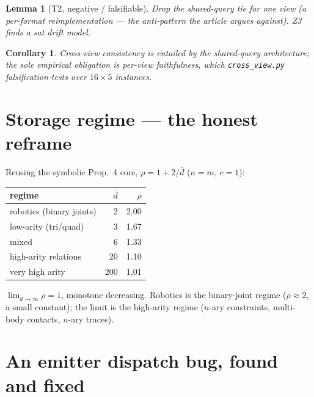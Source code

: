 \documentclass[11pt]{article}
\newtheorem{lemma}{Lemma}
\newtheorem{corollary}{Corollary}
\theoremstyle{definition}
\begin{document}
\begin{lemma}[T2, negative / falsifiable]
Drop the shared-query tie for one view (a per-format reimplementation --- the anti-pattern the article argues
against). Z3 finds a \textsf{sat} drift model.
\end{lemma}

\begin{corollary}
Cross-view consistency is \emph{entailed} by the shared-query architecture; the sole empirical obligation is
per-view faithfulness, which \texttt{cross\_view.py} falsification-tests over $16\times5$ instances.
\end{corollary}



\section{Storage regime --- the honest reframe}
\label{sec:storage_regime}

Reusing the symbolic Prop.~4 core, $\rho = 1 + 2/\bar d$ ($n=m,\,c=1$):

\begin{center}\small
\begin{tabular}{lrr}
\toprule regime & $\bar d$ & $\rho$ \\ \midrule
robotics (binary joints) & 2 & 2.00 \\
low-arity (tri/quad) & 3 & 1.67 \\
mixed & 6 & 1.33 \\
high-arity relations & 20 & 1.10 \\
very high arity & 200 & 1.01 \\ \bottomrule
\end{tabular}
\end{center}

$\lim_{\bar d\to\infty}\rho = 1$, monotone decreasing. Robotics is the binary-joint regime ($\rho\approx2$, a
small constant); the limit is the high-arity regime ($n$-ary constraints, multi-body contacts, $n$-ary traces).



\section{An emitter dispatch bug, found and fixed}
\label{sec:fix}
\end{document}
